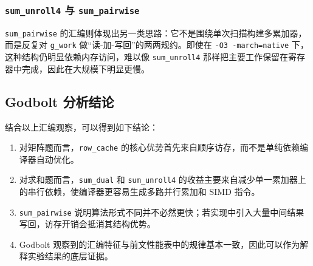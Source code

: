 \documentclass[a4paper]{article}
\begin{document}
\subsubsection{\texttt{sum\_unroll4} 与 \texttt{sum\_pairwise}}
\texttt{sum\_pairwise} 的汇编则体现出另一类思路：它不是围绕单次扫描构建多累加器，而是反复对 \texttt{g\_work} 做“读-加-写回”的两两规约。即使在 \texttt{-O3 -march=native} 下，这种结构仍明显依赖内存访问，难以像 \texttt{sum\_unroll4} 那样把主要工作保留在寄存器中完成，因此在大规模下明显更慢。

\subsection{Godbolt 分析结论}
结合以上汇编观察，可以得到如下结论：
\begin{enumerate}
  \item 对矩阵题而言，\texttt{row\_cache} 的核心优势首先来自顺序访存，而不是单纯依赖编译器自动优化。
  \item 对求和题而言，\texttt{sum\_dual} 和 \texttt{sum\_unroll4} 的收益主要来自减少单一累加器上的串行依赖，使编译器更容易生成多路并行累加和 SIMD 指令。
  \item \texttt{sum\_pairwise} 说明算法形式不同并不必然更快；若实现中引入大量中间结果写回，访存开销会抵消其结构优势。
  \item Godbolt 观察到的汇编特征与前文性能表中的规律基本一致，因此可以作为解释实验结果的底层证据。
\end{enumerate}
\end{document}
